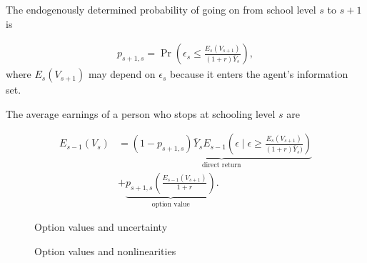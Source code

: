 \begin{frame}
The endogenously determined probability of going on from school level $s$ to $s + 1$ is

\begin{align*}
p_{s + 1, s} = \Pr\left(\epsilon_s \leq \frac{E_s(V_{s + 1})}{(1 + r) \bar{Y}_s}\right),
\end{align*}
where $E_s(V_{s + 1})$ may depend on $\epsilon_s$ because it enters the agent's information set.
\end{frame}
\begin{frame}
The average earnings of a person who stops at schooling level $s$ are

\begin{align*}
E_{s - 1}(V_s) & = \underbrace{(1 - p_{s + 1, s}) \bar{Y}_s E_{s - 1}\left(\epsilon\mid \epsilon \ge \frac{E_s(V_{s + 1})}{(1 + r)\bar{Y}_s)}\right)}_{\text{direct return}} \\
 & + \underbrace{p_{s + 1, s} \left(\frac{E_{s - 1}(V_{s + 1})}{1 + r}\right)}_{\text{option value}}.
\end{align*}
\end{frame}
\begin{frame}
\begin{figure}[htp]\centering
\caption{Option values and uncertainty}
\end{figure}
\end{frame}
\begin{frame}
\begin{figure}[htp]\centering
\caption{Option values and nonlinearities}
\end{figure}
\end{frame}
